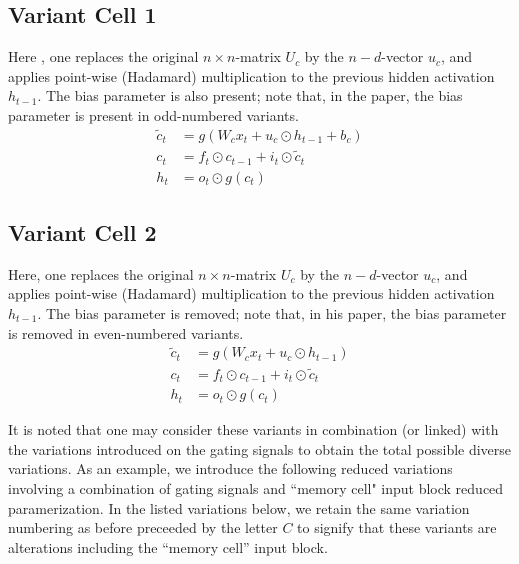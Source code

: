 \documentclass{article}
\begin{document}
{{{\subsection{Variant Cell 1}
Here , one replaces the original $n \times n$-matrix $U_c$ by the $n-d$-vector $u_c$, and applies point-wise (Hadamard) multiplication to the previous hidden activation $h_{t-1}$. The bias parameter is also present; note that, in the paper, the bias parameter is present in odd-numbered variants.
\begin{align}
	\label{eqn:2000}	\tilde{c}_t &= g(W_c x_t + u_c \odot h_{t-1} + b_c)\\
	\label{eqn:3000}	 c_t &= f_t \odot c_{t-1} + i_t \odot \tilde{c}_t\\
	\label{eqn:4000}	h_t &= o_t \odot g(c_t)
\end{align}

\subsection{Variant Cell 2}
Here, one replaces the original $n \times n$-matrix $U_c$ by the $n-d$-vector $u_c$, and applies point-wise (Hadamard) multiplication to the previous hidden activation $h_{t-1}$. The bias parameter is removed; note that, in his paper, the bias parameter is removed in even-numbered variants.
\begin{align}
	\label{eqn:2000}	\tilde{c}_t &= g(W_c x_t + u_c \odot h_{t-1})\\
	\label{eqn:3000}	 c_t &= f_t \odot c_{t-1} + i_t \odot \tilde{c}_t\\
	\label{eqn:4000}	h_t &= o_t \odot g(c_t)
\end{align}

 It is noted that one may consider these variants in combination (or linked) with the variations introduced on the gating signals to obtain the total possible diverse variations. As an example, we introduce the following reduced variations involving a combination of gating signals and ``memory cell" input block reduced paramerization. In the listed variations below, we retain the same variation numbering as before preceeded by the letter $C$ to signify that these variants are alterations including the ``memory cell''  input block.

}}}
\end{document}
